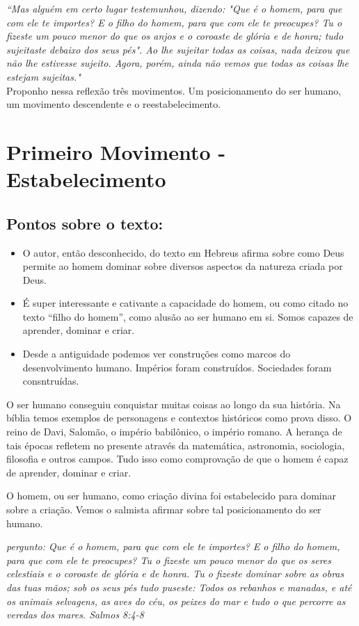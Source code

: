 \documentclass[12pt, legalpaper]{article}
\begin{document}
\emph{``Mas alguém em certo lugar testemunhou, dizendo: "Que é o homem, para que com ele te importes? E o filho do homem, para que com ele te preocupes? Tu o fizeste um pouco menor do que os anjos e o coroaste de glória e de honra; tudo sujeitaste debaixo dos seus pés". Ao lhe sujeitar todas as coisas, nada deixou que não lhe estivesse sujeito. Agora, porém, ainda não vemos que todas as coisas lhe estejam sujeitas."}
\\
Proponho nessa reflexão três movimentos. Um posicionamento do ser humano, um movimento descendente e o reestabelecimento.

\section{Primeiro Movimento - Estabelecimento}
\subsection{Pontos sobre o texto:}
 \begin{itemize}%
    \item O autor, então desconhecido, do texto em Hebreus afirma sobre como Deus permite ao homem dominar sobre diversos aspectos da natureza criada por Deus.
    \item É super interessante e cativante a capacidade do homem, ou como citado no texto “filho do homem”, como alusão ao ser humano em si. Somos capazes de aprender, dominar e criar. 
   \item Desde a antiguidade podemos ver construções como marcos do desenvolvimento humano. Impérios foram construídos. Sociedades foram consntruídas.
\end{itemize} 

O ser humano conseguiu conquistar muitas coisas ao longo da sua história. Na bíblia temos exemplos de personagens e contextos históricos como prova disso. 
O reino de Davi, Salomão, o império babilônico, o império romano. A herança de tais épocas refletem no presente através da matemática, astronomia, sociologia, filosofia e outros campos. Tudo isso como comprovação de que o homem é capaz de aprender, dominar e criar.

O homem, ou ser humano, como criação divina foi estabelecido para dominar sobre a criação. Vemos o salmista afirmar sobre tal posicionamento do ser humano.

\emph{pergunto: Que é o homem, para que com ele te importes? E o filho do homem, para que com ele te preocupes? Tu o fizeste um pouco menor do que os seres celestiais e o coroaste de glória e de honra. Tu o fizeste dominar sobre as obras das tuas mãos; sob os seus pés tudo puseste: Todos os rebanhos e manadas, e até os animais selvagens, as aves do céu, os peixes do mar e tudo o que percorre as veredas dos mares. Salmos 8:4-8}
\end{document}
